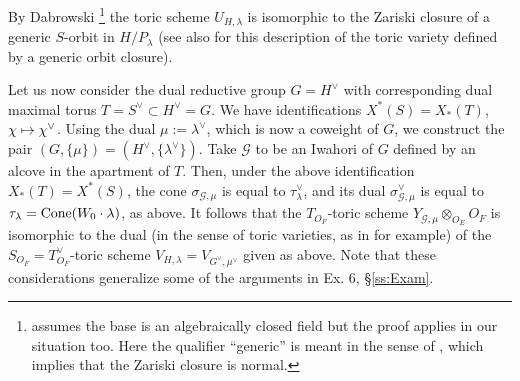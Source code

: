 \documentclass[reqno, 10pt]{amsart}
\makeatletter
\newcommand{\CG}{\ensuremath{\mathcal {G}}\xspace}
\theoremstyle{definition}
\numberwithin{equation}{subsection}
\numberwithin{subsubsection}{subsection}
\let\shortmapsto\mapsto
\renewcommand{\mapsto}{%
   \ifbool{@display}{\shortmapsto}{\shortmapsto}%
   }
\makeatother
\begin{document}
By Dabrowski  \cite[Thm. 3.2] {Dabrowski}\footnote{\cite{Dabrowski} assumes the base is an algebraically closed field but the proof applies in our situation too. Here the qualifier  ``generic'' is meant in the sense of \cite[Def. 1.1]{Dabrowski}, which implies that the Zariski closure is normal.} the toric scheme $U_{H,\lambda}$ is isomorphic to the Zariski closure of  a generic $S$-orbit in  $H/P_\lambda$ (see also \cite[Prop. 3]{MoR} for this description of the toric variety defined by a generic orbit closure). 
 

 

 
 

 Let us now consider the dual reductive group $G=H^\vee$ with corresponding dual maximal torus $T=S^\vee\subset H^\vee=G$. We have identifications $X^*(S)=X_*(T)$, $\chi\mapsto \chi^\vee$. Using the dual $\mu:=\lambda^\vee$, which is now a  coweight of $G$, we construct  the pair $(G, \{\mu\})=(H^\vee, \{\lambda^\vee\})$. Take $\CG$ to be an Iwahori of $G$ defined by an alcove in the apartment of $T$. Then, under the above identification $X_*(T)=X^*(S)$, the cone $\sigma_{\CG,\mu}$ is equal to $\tau^\vee_\lambda$, and its dual 
$\sigma_{\CG,\mu}^\vee$ is equal to $\tau_\lambda={\rm Cone}(W_0\cdot \lambda)$, as above. It follows that the $T_{O_F}$-toric scheme 
$Y_{\CG,\mu}\otimes_{O_E}O_F$ is isomorphic to the dual (in the sense of toric varieties, as in \cite[Def. 3.9.1]{BL} for example) of the $S_{O_F}=T^\vee_{O_F}$-toric scheme $V_{H,\lambda}=V_{G^\vee,\mu^\vee}$ given as above. Note that these considerations generalize some of the arguments in Ex. 6, \S \ref{ss:Exam}.
\end{document}
